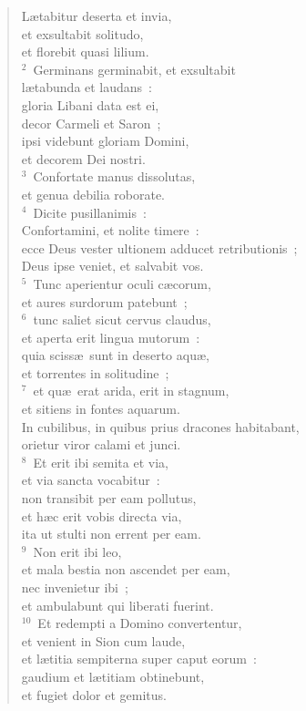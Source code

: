 \begin{flushleft}\begin{verse}\vspace{-19pt}\hspace{6pt}L\ae tabitur deserta et invia,\\\hspace{6pt} et exsultabit solitudo,\\ et florebit quasi lilium.\\
${}^{2}$~Germinans germinabit, et exsultabit\\ l\ae tabunda et laudans~:\\ gloria Libani data est ei,\\ decor Carmeli et Saron~;\\ ipsi videbunt gloriam Domini,\\ et decorem Dei nostri.\\
${}^{3}$~Confortate manus dissolutas,\\ et genua debilia roborate.\\
${}^{4}$~Dicite pusillanimis~:\\ Confortamini, et nolite timere~:\\ ecce Deus vester ultionem adducet retributionis~;\\ Deus ipse veniet, et salvabit vos.\\
${}^{5}$~Tunc aperientur oculi c\ae corum,\\ et aures surdorum patebunt~;\\
${}^{6}$~tunc saliet sicut cervus claudus,\\ et aperta erit lingua mutorum~:\\ quia sciss\ae\ sunt in deserto aqu\ae ,\\ et torrentes in solitudine~;\\
${}^{7}$~et qu\ae\ erat arida, erit in stagnum,\\ et sitiens in fontes aquarum.\\ In cubilibus, in quibus prius dracones habitabant,\\ orietur viror calami et junci.\\
${}^{8}$~Et erit ibi semita et via,\\ et via sancta vocabitur~:\\ non transibit per eam pollutus,\\ et h\ae c erit vobis directa via,\\ ita ut stulti non errent per eam.\\
${}^{9}$~Non erit ibi leo,\\ et mala bestia non ascendet per eam,\\ nec invenietur ibi~;\\ et ambulabunt qui liberati fuerint.\\
${}^{10}$~Et redempti a Domino convertentur,\\ et venient in Sion cum laude,\\ et l\ae titia sempiterna super caput eorum~:\\ gaudium et l\ae titiam obtinebunt,\\ et fugiet dolor et gemitus.\end{verse}\end{flushleft}
